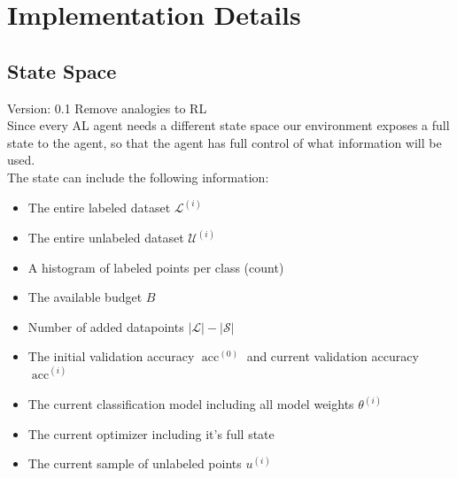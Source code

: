 \documentclass[]{article}
\begin{document}
\section{Implementation Details}

\subsection{State Space}
{\color{red} Version: 0.1 Remove analogies to RL}\\
Since every AL agent needs a different state space our environment exposes a full state to the agent, so that the agent has full control of what information will be used. \\ [1mm]
The state can include the following information:
\begin{itemize}
	\item The entire labeled dataset $\mathcal{L}^{(i)}$
	\item The entire unlabeled dataset $\mathcal{U}^{(i)}$
	\item A histogram of labeled points per class (count)
	\item The available budget $B$
	\item Number of added datapoints $|\mathcal{L}| - |\mathcal{S}|$
	\item The initial validation accuracy $\operatorname{acc}^{(0)}$ and current validation accuracy $\operatorname{acc}^{(i)}$
	\item The current classification model including all model weights $\theta^{(i)}$
	\item The current optimizer including it's full state
	\item The current sample of unlabeled points $u^{(i)}$
\end{itemize}

\end{document}
